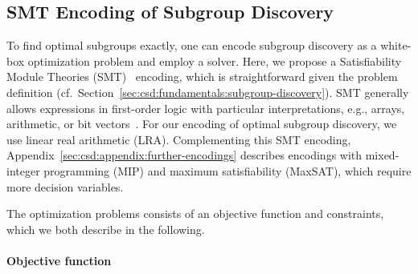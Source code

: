 \documentclass{article}
\theoremstyle{definition}
\begin{document}
\subsection{SMT Encoding of Subgroup Discovery}
\label{sec:csd:approach:smt}

To find optimal subgroups exactly, one can encode subgroup discovery as a white-box optimization problem and employ a solver.
Here, we propose a Satisfiability Module Theories (SMT)~\cite{barrett2018satisfiability} encoding, which is straightforward given the problem definition (cf.~Section~\ref{sec:csd:fundamentals:subgroup-discovery}).
SMT generally allows expressions in first-order logic with particular interpretations, e.g., arrays, arithmetic, or bit vectors~\cite{barrett2018satisfiability}.
For our encoding of optimal subgroup discovery, we use linear real arithmetic (LRA).
Complementing this SMT encoding, Appendix~\ref{sec:csd:appendix:further-encodings} describes encodings with mixed-integer programming (MIP) and maximum satisfiability (MaxSAT), which require more decision variables.

The optimization problems consists of an objective function and constraints, which we both describe in the following.

\paragraph{Objective function}
\end{document}
